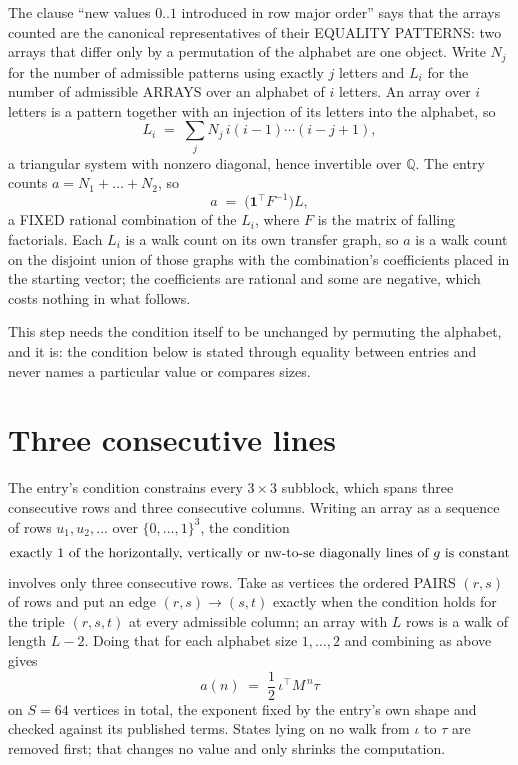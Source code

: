 \documentclass[11pt,a4paper]{article}
\theoremstyle{plain}
\theoremstyle{definition}
\begin{document}
The clause ``new values $0..1$ introduced in row major order'' says that the arrays
counted are the canonical representatives of their EQUALITY PATTERNS: two arrays that differ
only by a permutation of the alphabet are one object. Write $N_j$ for the number of admissible
patterns using exactly $j$ letters and $L_i$ for the number of admissible ARRAYS over an
alphabet of $i$ letters. An array over $i$ letters is a pattern together with an injection of
its letters into the alphabet, so
\[
L_i\;=\;\sum_{j}N_j\,i(i-1)\cdots(i-j+1),
\]
a triangular system with nonzero diagonal, hence invertible over $\mathbb{Q}$. The entry
counts $a=N_1+\dots+N_{2}$, so
\[
a\;=\;\bigl(\mathbf{1}^{\!\top}F^{-1}\bigr)L ,
\]
a FIXED rational combination of the $L_i$, where $F$ is the matrix of falling factorials.
Each $L_i$ is a walk count on its own transfer graph, so $a$ is a walk count on the disjoint
union of those graphs with the combination's coefficients placed in the starting vector; the
coefficients are rational and some are negative, which costs nothing in what follows.

This step needs the condition itself to be unchanged by permuting the alphabet, and it is:
the condition below is stated through equality between entries and never names a particular
value or compares sizes.

\section{Three consecutive lines}

The entry's condition constrains every $3\times3$ subblock, which spans three consecutive
rows and three consecutive columns. Writing an array as a sequence of rows
$u_1,u_2,\dots$ over $\{0,\dots,1\}^{3}$, the condition
\[
\text{exactly }1\text{ of the horizontally, vertically or nw-to-se diagonally lines of }g\text{ \text{is constant}}
\]
involves only three consecutive rows. Take as vertices the ordered PAIRS $(r,s)$ of
rows and put an edge $(r,s)\to(s,t)$ exactly when the condition holds for the triple
$(r,s,t)$ at every admissible column; an array with $L$ rows is a walk of length $L-2$.
Doing that for each alphabet size $1,\dots,2$ and combining as above gives
\[
a(n)\;=\;\frac{1}{2}\,\iota^{\!\top}M^{\,n}\tau
\]
on $S=64$ vertices in total, the exponent fixed by the entry's own shape and checked against
its published terms. States lying on no walk from $\iota$ to $\tau$ are removed first; that
changes no value and only shrinks the computation.
\end{document}
